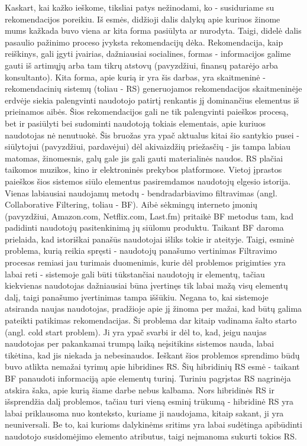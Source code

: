 \documentclass{VUMIFInfMagistrinis}
\begin{document}
\linespread{1.5}
\selectfont
\indent
Kaskart, kai kažko ieškome, tiksliai patys nežinodami, ko - susiduriame su rekomendacijos poreikiu. Iš esmės, didžioji dalis dalykų apie kuriuos žinome mums kažkada buvo viena ar kita forma pasiūlyta ar nurodyta. Taigi, didelė dalis pasaulio pažinimo proceso įvyksta rekomendacijų dėka. Rekomendacija, kaip reiškinys, gali įgyti įvairias, dažniausiai socialines, formas - informacijos galime gauti iš artimųjų arba tam tikrų atstovų (pavyzdžiui, finansų patarėjo arba konsultanto). Kita forma, apie kurią ir yra šis darbas, yra skaitmeninė - rekomendacinių sistemų (toliau - RS) generuojamos rekomendacijos skaitmeninėje erdvėje siekia palengvinti naudotojo patirtį renkantis jį dominančius elementus iš prieinamos aibės. Šios rekomendacijos gali ne tik palengvinti paieškos procesą, bet ir pasiūlyti bei sudominti naudotoją tokiais elementais, apie kuriuos naudotojas nė nenutuokė. Šis bruožas yra ypač aktualus kitai šio santykio pusei - siūlytojui (pavyzdžiui, pardavėjui) dėl akivaizdžių priežasčių - jis tampa labiau matomas, žinomesnis, galų gale jis gali gauti materialinės naudos.
\newline
\indent
RS plačiai taikomos muzikos, kino ir elektroninės prekybos platformose. Vietoj įprastos paieškos šios sistemos siūlo elementus pasiremdamos naudotojų elgesio istorija. Vienas labiausiai naudojamų metodų - bendradarbiavimo filtravimas (angl. Collaborative Filtering, toliau - BF). Aibė sėkmingų interneto įmonių (pavyzdžiui, Amazon.com, Netflix.com, Last.fm) pritaikė BF metodus tam, kad padidinti naudotojų pasitenkinimą jų siūlomu produktu. Taikant BF daroma prielaida, kad istoriškai panašūs naudotojai išliks tokie ir ateityje. Taigi, esminė problema, kurią reikia spręsti - naudotojų panašumo vertinimas Filtravimo procesas remiasi jau turimais duomenimis, kurie dėl problemos prigimties yra labai reti - sistemoje gali būti tūkstančiai naudotojų ir elementų, tačiau kiekvienas naudotojas dažniausiai būna įvertinęs tik labai mažą visų elementų dalį, taigi panašumo įvertinimas tampa iššūkiu. Negana to, kai sistemoje atsiranda naujas naudotojas, pradžioje apie jį žinoma per mažai, kad būtų galima pateikti patikimas rekomendacijas. Ši problema dar kitaip vadinama šalto starto (angl. cold start problem). Ji yra ypač svarbi ir dėl to, kad, jeigu naujas naudotojas per pakankamai trumpą laiką neįsitikins sistemos nauda, labai tikėtina, kad jis niekada ja nebesinaudos.
\newline
\indent
Ieškant šios problemos sprendimo būdų buvo atlikta nemažai tyrimų apie hibridines RS. Šių hibridinių RS esmė - taikant BF panaudoti informaciją apie elementų turinį. Turiniu pagrįstas RS nagrinėja atskira šaka, apie kurią šiame darbe nebus kalbama. Nors hibridinės RS ir išsprendžia dalį problemos, tačiau turi vieną esminį trūkumą - hibridinė RS yra labai priklausoma nuo konteksto, kuriame ji naudojama, kitaip sakant, ji yra neuniversali. Be to, kai kurioms dalykinėms sritims yra labai sudėtinga apibūdinti naudotojo susidomėjimo elemento atributus, taigi neįmanoma sukurti tokios RS.
\end{document}
